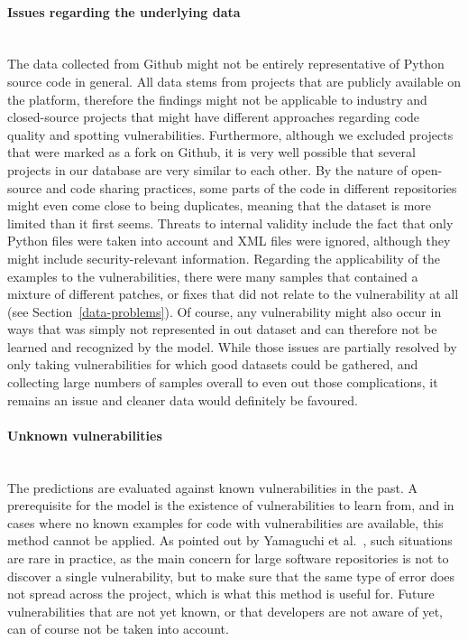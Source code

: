 \documentclass[
a4paper,
pagesize,
pdftex,
12pt,
twoside, %
BCOR=5mm, %
ngerman,
fleqn,
final,
]{scrartcl}
\begin{document}
	\paragraph{Issues regarding the underlying data}\mbox{}\\
	The data collected from Github might not be entirely representative of Python source code in general. All data stems from projects that are publicly available on the platform, therefore the findings might not be applicable to industry and closed-source projects that might have different approaches regarding code quality and spotting vulnerabilities. Furthermore, although we excluded projects that were marked as a fork on Github, it is very well possible that several projects in our database are very similar to each other. By the nature of open-source and code sharing practices, some parts of the code in different repositories might even come close to being duplicates, meaning that the dataset is more limited than it first seems. Threats to internal validity include the fact that only Python files were taken into account and XML files were ignored, although they might include security-relevant information. Regarding the applicability of the examples to the vulnerabilities, there were many samples that contained a mixture of different patches, or fixes that did not relate to the vulnerability at all (see Section~\ref{data-problems}). Of course, any vulnerability might also occur in ways that was simply not represented in out dataset and can therefore not be learned and recognized by the model. While those issues are partially resolved by only taking vulnerabilities for which good datasets could be gathered, and collecting large numbers of samples overall to even out those complications, it remains an issue and cleaner data would definitely be favoured.
	\paragraph{Unknown vulnerabilities}\mbox{}\\
	The predictions are evaluated against known vulnerabilities in the past. A prerequisite for the model is the existence of vulnerabilities to learn from, and in cases where no known examples for code with vulnerabilities are available, this method cannot be applied. As pointed out by Yamaguchi et al.~\cite{Yamaguchi.2012}, such situations are rare in practice, as the main concern for large software repositories is not to discover a single vulnerability, but to make sure that the same type of error does not spread across the project, which is what this method is useful for. Future vulnerabilities that are not yet known, or that developers are not aware of yet, can of course not be taken into account.
\end{document}
